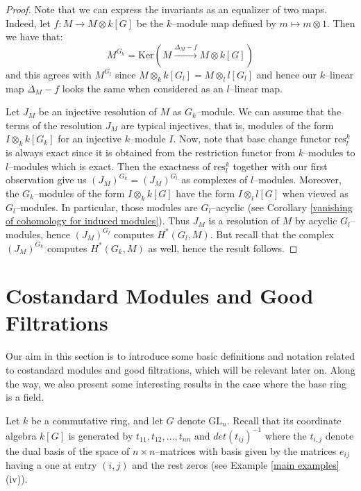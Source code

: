 \documentclass{article}
\theoremstyle{plain}
\theoremstyle{definition}
\newcommand{\GL}{\mathrm{GL}}
\begin{document}
\begin{proof}
    Note that we can express the invariants as an equalizer of two maps. Indeed,  let $f\colon M\to M\otimes k[G]$ be the $k$--module map defined by $m\mapsto m\otimes 1$. Then we have that: 
    \[
    M^{G_k}=\mathrm{Ker}(M\xrightarrow[]{\Delta_M-f} M\otimes k[G] )
    \]
     and this agrees with $M^{G_l}$ since $M\otimes_k k[G_l]=M\otimes_l l[G_l]$ and hence our $k$--linear map $\Delta_M-f$ looks the same when considered as an $l$--linear map. 
     
    Let $J_M$ be an injective resolution of $M$ as $G_k$--module. We can assume that the terms of the resolution $J_M$ are typical injectives, that is, modules of the form $I\otimes_k k[G_k]$ for an injective $k$--module $I$.  Now, note that base change functor $\mathrm{res}^k_l$ is always exact since it is obtained from the restriction functor from $k$--modules to $l$--modules which is exact. Then the exactness of $\mathrm{res}^k_l$ together with our first observation give us  $(J_M)^{G_k}=(J_M)^{G_l}$ as complexes of $l$--modules. Moreover, the $G_k$--modules of the form $I\otimes_k k[G]$ have the form $I\otimes_l l[G]$ when viewed as $G_l$--modules. In particular, those modules are $G_l$--acyclic (see Corollary \ref{vanishing of cohomology for induced modules}). Thus $J_M$ is a resolution of $M$ by acyclic $G_l$--modules, hence $(J_M)^{G_l}$ computes  $H^\ast(G_l,M)$. But recall that the complex $(J_M)^{G_k}$ computes $H^\ast(G_k,M)$ as well, hence the result follows.  
\end{proof}




\pagebreak

\section{Costandard Modules and Good Filtrations}

Our aim in this section is to introduce some basic definitions and notation related to costandard modules and good filtrations, which will be relevant later on. Along the way, we also present some interesting results in the case where the base ring is a field. 


 Let $k$ be a commutative ring, and let $G$ denote $\GL_n$. Recall that its coordinate algebra $k[G]$ is generated by  $t_{11}, t_{12}, \dots, t_{nn}$ and $det(t_{ij})^{-1}$ where the $t_{i,j}$ denote the dual basis of the space of $n\times n$--matrices with basis given by the matrices $e_{ij}$ having a one at entry $(i,j)$ and the rest zeros (see Example \ref{main examples}(iv)). 
\end{document}
